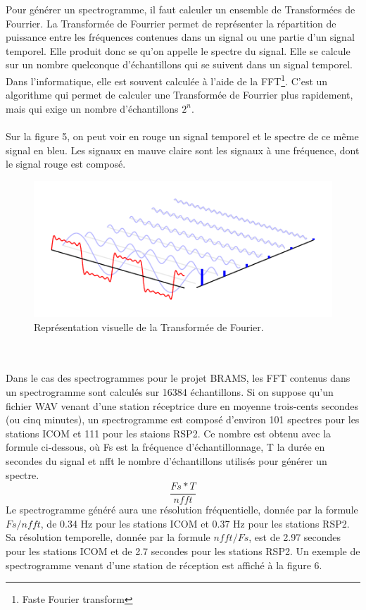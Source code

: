 \documentclass[11pt]{article}
\begin{document}
Pour générer un spectrogramme, il faut calculer un ensemble de Transformées de Fourrier.
La Transformée de Fourrier permet de représenter la répartition de puissance entre les fréquences contenues dans un signal ou une partie d'un signal temporel.
Elle produit donc se qu'on appelle le spectre du signal.
Elle se calcule sur un nombre quelconque d'échantillons qui se suivent dans un signal temporel.
Dans l'informatique, elle est souvent calculée à l'aide de la FFT\footnote{Faste Fourier transform}.
C'est un algorithme qui permet de calculer une Transformée de Fourrier plus rapidement, mais qui exige un nombre d'échantillons $2^{n}$.\\
\\
Sur la figure 5, on peut voir en rouge un signal temporel et le spectre de ce même signal en bleu.
Les signaux en mauve claire sont les signaux à une fréquence, dont le signal rouge est composé.
\begin{figure}[t]
    \begin{center}
        \includegraphics[scale=0.7]{spectre.png}
        \caption{Représentation visuelle de la Transformée de Fourier.}
    \end{center}
\end{figure}
\\
\\
Dans le cas des spectrogrammes pour le projet BRAMS, les FFT contenus dans un spectrogramme sont calculés sur 16384 échantillons.
Si on suppose qu'un fichier WAV venant d'une station réceptrice dure en moyenne trois-cents secondes (ou cinq minutes), un spectrogramme est composé d'environ 101 spectres pour les stations ICOM et 111 pour les staions RSP2.
Ce nombre est obtenu avec la formule ci-dessous, où Fs est la fréquence d'échantillonnage, T la durée en secondes du signal et nfft le nombre d'échantillons utilisés pour générer un spectre.
\[\frac{Fs * T}{nfft}\]
Le spectrogramme généré aura une résolution fréquentielle, donnée par la formule \(Fs / nfft\), de 0.34 Hz pour les stations ICOM et 0.37 Hz pour les stations RSP2.
Sa résolution temporelle, donnée par la formule \(nfft / Fs\), est de 2.97 secondes pour les stations ICOM et de 2.7 secondes pour les stations RSP2.
Un exemple de spectrogramme venant d'une station de réception est affiché à la figure 6.
\end{document}
